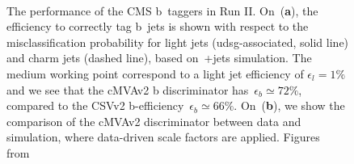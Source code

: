 \begin{figure}
\begin{centering}
 \\
\caption[The performance of the CMS b~taggers in Run II]{The performance of the CMS b~taggers in Run II. On~(\textbf{a}), the efficiency to correctly tag b~jets is shown with respect to the misclassification probability for light jets (udsg-associated, solid line) and charm jets (dashed line), based on~\ttbar+jets simulation. The medium working point correspond to a light jet efficiency of $\epsilon_{l} = 1\%$ and we see that the cMVAv2 b discriminator has~$\epsilon_{b} \simeq 72\%$, compared to the CSVv2 b-efficiency~$\epsilon_{b} \simeq 66\%$. On~(\textbf{b}), we show the comparison of the cMVAv2 discriminator between data and simulation, where data-driven scale factors are applied. Figures from~\cite{CMS-PAS-BTV-15-001}}
\label{fig:btag_roc}
\end{centering}
\end{figure}

